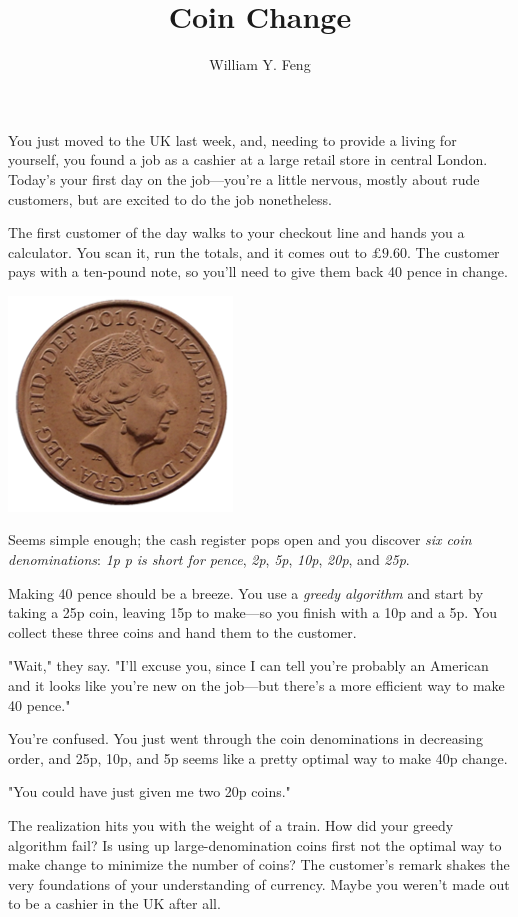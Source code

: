 \documentclass{article}
\title{Coin Change}
\author{William Y. Feng}
\begin{document}
\maketitle
You just moved to the UK last week, and, needing to provide a living for yourself, you found a job as a cashier at a large retail store in central London. Today's your first day on the job—you're a little nervous, mostly about rude customers, but are excited to do the job nonetheless.

The first customer of the day walks to your checkout line and hands you a calculator. You scan it, run the totals, and it comes out to $\pounds 9.60$. The customer pays with a ten-pound note, so you'll need to give them back 40 pence in change.
\begin{center}
\includegraphics[scale=0.6]{images/british_coin.png}
\end{center}
Seems simple enough; the cash register pops open and you discover \textit{six coin denominations}: \textit{1p} \textit{p is short for pence}, \textit{2p}, \textit{5p}, \textit{10p}, \textit{20p}, and \textit{25p}.

Making 40 pence should be a breeze. You use a \textit{greedy algorithm} and start by taking a 25p coin, leaving 15p to make—so you finish with a 10p and a 5p. You collect these three coins and hand them to the customer.

"Wait," they say. "I'll excuse you, since I can tell you're probably an American and it looks like you're new on the job—but there's a more efficient way to make 40 pence."

You're confused. You just went through the coin denominations in decreasing order, and 25p, 10p, and 5p seems like a pretty optimal way to make 40p change.

"You could have just given me two 20p coins."

The realization hits you with the weight of a train. How did your greedy algorithm fail? Is using up large-denomination coins first not the optimal way to make change to minimize the number of coins? The customer's remark shakes the very foundations of your understanding of currency. Maybe you weren't made out to be a cashier in the UK after all.
\end{document}
